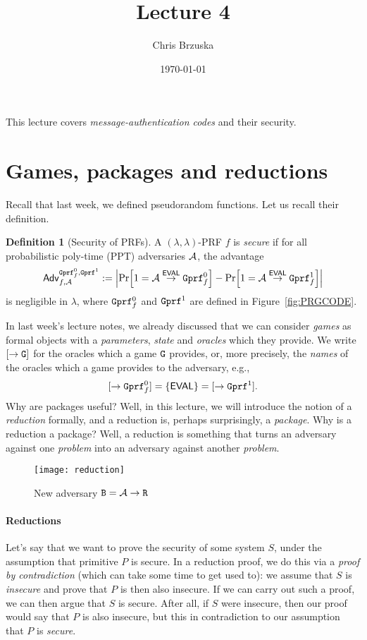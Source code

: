 \documentclass[a4paper,table,dvipsnames]{article}
\title{Lecture 4}
\author{Chris Brzuska}
\date{\today}
\theoremstyle{definition}
\newtheorem{definition}{Definition}[section]
\newcommand{\M}[1]{\ensuremath{\text{\texttt{#1}}}}
\renewcommand{\O}[1]{\ensuremath{\mathsf{#1}}}
\renewcommand{\circ}{\rightarrow}
\begin{document}
This lecture covers \emph{message-authentication codes} and their security.

\section{Games, packages and reductions}
Recall that last week, we defined pseudorandom functions. Let us recall their definition.
\begin{definition}[Security of PRFs]\label{def:mono}
A $(\lambda,\lambda)$-PRF $f$ is \emph{secure} if for all probabilistic poly-time (PPT) adversaries $\mathcal{A}$, the advantage
\[\mathsf{Adv}^{\M{Gprf}_f^0,\M{Gprf}^1}_{f,\adv}:=\abs{\prob{1=\adv\stackrel{\O{EVAL}}{\rightarrow}\M{Gprf}^0_f}-
\prob{1=\adv\stackrel{\O{EVAL}}{\rightarrow}\M{Gprf}^1_f}}\]
is negligible in $\lambda$, where $\M{Gprf}_f^0$ and $\M{Gprf}^1$ are defined in Figure~\ref{fig:PRGCODE}.
\end{definition}
In last week's lecture notes, we already discussed that we can consider \emph{games} as formal objects with
a \emph{parameters}, \emph{state} and \emph{oracles} which they provide. We write $[\rightarrow \M{G}]$ for the
oracles which a game $\M{G}$ provides, or, more precisely, the \emph{names} of the oracles which a game provides
 to the adversary, e.g.,
\[[\rightarrow\M{Gprf}_f^0]=\{\O{EVAL}\}=[\rightarrow\M{Gprf}^1].\]
Why are packages useful? Well, in this lecture, we will introduce the notion of a \emph{reduction} formally,
and a reduction is, perhaps surprisingly, a \emph{package}. Why is a reduction a package? Well, a reduction is
something that turns an adversary against one \emph{problem} into an adversary against another \emph{problem}.

\begin{wrapfigure}{R}{0.6\textwidth}
\vspace{-0.5cm}
\begin{center}
\texttt{[image: reduction]}
\caption{\label{fig:reduction-example}New adversary $\M{B}=\adv\circ\M{R}$}
\end{center}
\vspace{-0.5cm}
\end{wrapfigure}

\paragraph{Reductions}
Let's say that we want to prove the security of some system $S$, under the assumption that primitive $P$ is secure. In a reduction proof, we do this via a \emph{proof by contradiction} (which can take some time to get used to): we assume that $S$ is \emph{insecure} and prove that $P$ is then also insecure. If we can carry out such a proof, we can then argue that $S$ is secure. After all, if $S$ were insecure, then our proof would say that $P$ is also insecure, but this in contradiction to our assumption that $P$ is \emph{secure}.
\end{document}
